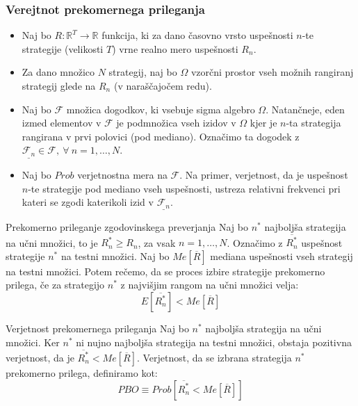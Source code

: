 \documentclass{beamer}
\begin{document}
\begin{frame}
\frametitle{Verejtnot prekomernega prileganja}
\begin{itemize}
\item Naj bo $R: \mathbb{R}^T \rightarrow \mathbb{R}$ funkcija, ki za dano časovno vrsto uspešnosti $n$-te strategije (velikosti $T$) vrne realno mero uspešnosti $R_n$.
\item Za dano množico $N$ strategij, naj bo $\Omega$ vzorčni prostor vseh možnih rangiranj strategij glede na $R_n$ (v naraščajočem redu). 
\item Naj bo $\mathcal{F}$ množica dogodkov, ki vsebuje sigma algebro $\Omega$. Natančneje, eden izmed elementov v $\mathcal{F}$ je podmnožica vseh izidov v $\Omega$ kjer je $n$-ta strategija rangirana v prvi polovici (pod mediano). Označimo ta dogodek z $\underline{\mathcal{F}_n} \in \mathcal{F}, \ \forall \ n = 1,\dots, N$.
\item Naj bo $Prob$ verjetnostna mera na $\mathcal{F}$. Na primer, verjetnost, da je uspešnost $n$-te strategije pod mediano vseh uspešnosti, ustreza relativni frekvenci pri kateri se zgodi katerikoli izid v $\underline{\mathcal{F}_n}$.
\end{itemize}

\end{frame}


\begin{frame}
\begin{block}{Prekomerno prileganje zgodovinskega preverjanja}
Naj bo $n^*$ najboljša strategija na učni množici, to je $R_n^* \ge R_n$, za vsak $n = 1,\dots,N$. Označimo z $\overline{R_n^*}$ uspešnost strategije $n^*$ na testni množici. Naj bo $Me[\overline{R}]$ mediana uspešnosti vseh strategij na testni množici. Potem rečemo, da se proces izbire strategije prekomerno prilega, če za strategijo $n^*$ z najvišjim rangom na učni množici velja: $$E[\overline{R_{n}^{*}}] < Me[\overline{R}]$$
\end{block}

\begin{block}{Verjetnost prekomernega prileganja}
Naj bo $n^*$ najboljša strategija na učni množici. Ker $n^*$ ni nujno najboljša strategija na testni množici, obstaja pozitivna verjetnost, da je $\overline{R_n^*} < Me[\overline{R}]$. Verjetnost, da se izbrana strategija $n^*$ prekomerno prilega, definiramo kot: $$PBO \equiv Prob[\overline{R_n^*} < Me[\overline{R}]]$$
\end{block}

\end{frame}
\end{document}
